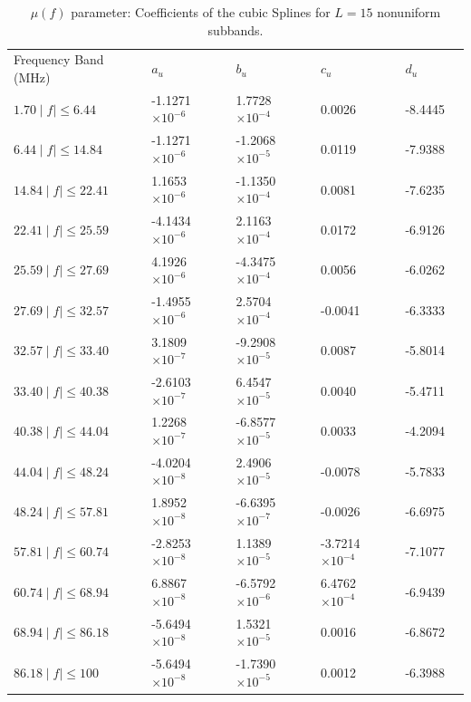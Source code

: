 \documentclass[journal]{IEEEtran}
\begin{document}
\begin{table}[h]
	\setlength\extrarowheight{4.5pt}
	\centering
	\vspace*{-5mm}
	\caption{$\mu(f)$ parameter: Coefficients of the cubic Splines for $L=15$ nonuniform subbands.}
	\label{table_alfalW}
	\begin{tabular}{|C{3.5cm}|C{2.5cm}|C{2.5cm}|C{2.5cm}|C{2.5cm}|m{0cm}}
		Frequency Band (MHz)           		   & $a_u$    			   	   & $b_u$      			  & $c_u$   		 		 & $d_u$ &\\ 
		$1.70 \mid f\mid \leq 6.44$   & -1.1271 $\times 10^{-6}$  & 1.7728 $\times 10^{-4}$  & 0.0026	 				 & -8.4445 &\\ 
		$6.44 \mid f\mid \leq 14.84$  & -1.1271 $\times 10^{-6}$  & -1.2068 $\times 10^{-5}$ & 0.0119  				 & -7.9388 &\\ 
		$14.84 \mid f\mid \leq 22.41$ & 1.1653  $\times 10^{-6}$  & -1.1350 $\times 10^{-4}$ & 0.0081 					 & -7.6235 &\\ 
		$22.41 \mid f\mid \leq 25.59$ & -4.1434 $\times 10^{-6}$  & 2.1163 $\times 10^{-4}$  & 0.0172	 				 & -6.9126 &\\ 
		$25.59 \mid f\mid \leq 27.69$ & 4.1926 $\times 10^{-6}$   & -4.3475 $\times 10^{-4}$ & 0.0056					 & -6.0262 &\\ 
		$27.69 \mid f\mid \leq 32.57$ & -1.4955 $\times 10^{-6}$  & 2.5704 $\times 10^{-4}$  & -0.0041	 				 & -6.3333 &\\ 
		$32.57 \mid f\mid \leq 33.40$ & 3.1809 $\times 10^{-7}$   & -9.2908 $\times 10^{-5}$ & 0.0087   				 & -5.8014 &\\ 
		$33.40 \mid f\mid \leq 40.38$ & -2.6103 $\times 10^{-7}$  & 6.4547 $\times 10^{-5}$  & 0.0040 					 & -5.4711 &\\ 
		$40.38 \mid f\mid \leq 44.04$ & 1.2268  $\times 10^{-7}$  & -6.8577 $\times 10^{-5}$ & 0.0033					 & -4.2094 &\\ 
		$44.04 \mid f\mid \leq 48.24$ & -4.0204 $\times 10^{-8}$  & 2.4906 $\times 10^{-5}$  & -0.0078	 				 & -5.7833 &\\ 
		$48.24 \mid f\mid \leq 57.81$ & 1.8952  $\times 10^{-8}$  & -6.6395 $\times 10^{-7}$ & -0.0026  				 & -6.6975 &\\ 
		$57.81 \mid f\mid \leq 60.74$ & -2.8253  $\times 10^{-8}$ & 1.1389 $\times 10^{-5}$  & -3.7214 $\times 10^{-4}$ & -7.1077 &\\ 
		$60.74 \mid f\mid \leq 68.94$ & 6.8867 $\times 10^{-8}$   & -6.5792 $\times 10^{-6}$ & 6.4762	$\times 10^{-4}$ & -6.9439 &\\ 
		$68.94 \mid f\mid \leq 86.18$ & -5.6494  $\times 10^{-8}$ & 1.5321 $\times 10^{-5}$  & 0.0016 				     & -6.8672 &\\ 
		$86.18 \mid f\mid \leq 100$   & -5.6494 $\times 10^{-8}$  & -1.7390 $\times 10^{-5}$ & 0.0012  				 & -6.3988 &\\ 
	\end{tabular}
\end{table}
\end{document}
